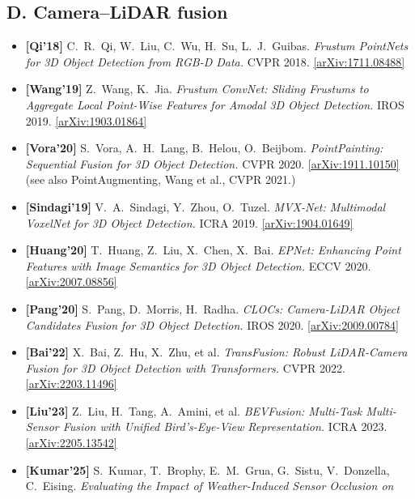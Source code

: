 \documentclass[10pt,a4paper]{article}
\begin{document}
{\subsection*{D. Camera--LiDAR fusion}
\begin{itemize}[leftmargin=1.4em,itemsep=3pt,topsep=2pt]
  \item \textbf{[Qi'18]} C.~R.~Qi, W.~Liu, C.~Wu, H.~Su, L.~J.~Guibas. \emph{Frustum
  PointNets for 3D Object Detection from RGB-D Data.} CVPR 2018.
  \href{https://arxiv.org/abs/1711.08488}{[arXiv:1711.08488]}
  \item \textbf{[Wang'19]} Z.~Wang, K.~Jia. \emph{Frustum ConvNet: Sliding Frustums to
  Aggregate Local Point-Wise Features for Amodal 3D Object Detection.} IROS 2019.
  \href{https://arxiv.org/abs/1903.01864}{[arXiv:1903.01864]}
  \item \textbf{[Vora'20]} S.~Vora, A.~H.~Lang, B.~Helou, O.~Beijbom. \emph{PointPainting:
  Sequential Fusion for 3D Object Detection.} CVPR 2020.
  \href{https://arxiv.org/abs/1911.10150}{[arXiv:1911.10150]} \,(see also PointAugmenting,
  Wang et al., CVPR 2021.)
  \item \textbf{[Sindagi'19]} V.~A.~Sindagi, Y.~Zhou, O.~Tuzel. \emph{MVX-Net: Multimodal
  VoxelNet for 3D Object Detection.} ICRA 2019.
  \href{https://arxiv.org/abs/1904.01649}{[arXiv:1904.01649]}
  \item \textbf{[Huang'20]} T.~Huang, Z.~Liu, X.~Chen, X.~Bai. \emph{EPNet: Enhancing Point
  Features with Image Semantics for 3D Object Detection.} ECCV 2020.
  \href{https://arxiv.org/abs/2007.08856}{[arXiv:2007.08856]}
  \item \textbf{[Pang'20]} S.~Pang, D.~Morris, H.~Radha. \emph{CLOCs: Camera-LiDAR Object
  Candidates Fusion for 3D Object Detection.} IROS 2020.
  \href{https://arxiv.org/abs/2009.00784}{[arXiv:2009.00784]}
  \item \textbf{[Bai'22]} X.~Bai, Z.~Hu, X.~Zhu, et al. \emph{TransFusion: Robust
  LiDAR-Camera Fusion for 3D Object Detection with Transformers.} CVPR 2022.
  \href{https://arxiv.org/abs/2203.11496}{[arXiv:2203.11496]}
  \item \textbf{[Liu'23]} Z.~Liu, H.~Tang, A.~Amini, et al. \emph{BEVFusion: Multi-Task
  Multi-Sensor Fusion with Unified Bird's-Eye-View Representation.} ICRA 2023.
  \href{https://arxiv.org/abs/2205.13542}{[arXiv:2205.13542]}
  \item \textbf{[Kumar'25]} S.~Kumar, T.~Brophy, E.~M.~Grua, G.~Sistu, V.~Donzella,
  C.~Eising. \emph{Evaluating the Impact of Weather-Induced Sensor Occlusion on
}
\end{itemize}}
\end{document}
